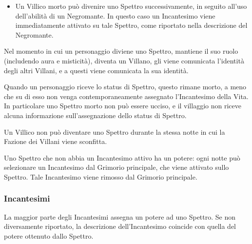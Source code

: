 \documentclass[a4paper,10pt]{article}
\begin{document}
\begin{itemize}
\begin{itemize}
		      \item Un Villico morto può divenire uno Spettro successivamente, in seguito all'uso dell'abilità di un Negromante. In questo caso un Incantesimo viene immediatamente attivato su tale Spettro, come riportato nella descrizione del Negromante.

	      \end{itemize}

	      Nel momento in cui un personaggio diviene uno Spettro, mantiene il suo ruolo (includendo aura e misticità), diventa un Villano, gli viene comunicata l'identità degli altri Villani, e a questi viene comunicata la sua identità.

	      Quando un personaggio riceve lo status di Spettro, questo rimane morto, a meno che su di esso non venga contemporaneamente assegnato l'Incantesimo della Vita. In particolare uno Spettro morto non può essere ucciso, e il villaggio non riceve alcuna informazione sull'assegnazione dello status di Spettro.

	      Un Villico non può diventare uno Spettro durante la stessa notte in cui la Fazione dei Villani viene sconfitta.

	      Uno Spettro che non abbia un Incantesimo attivo ha un potere: ogni notte può selezionare un Incantesimo dal Grimorio principale, che viene attivato sullo Spettro. Tale Incantesimo viene rimosso dal Grimorio principale.
\end{itemize}


\subsubsection*{Incantesimi}\label{incantesimi}

La maggior parte degli Incantesimi assegna un potere ad uno Spettro. Se non diversamente riportato, la descrizione dell'Incantesimo coincide con quella del potere ottenuto dallo Spettro.
\end{document}
